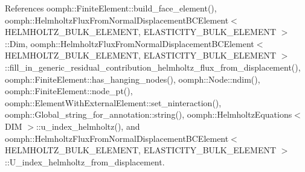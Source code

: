 References oomph\+::\+Finite\+Element\+::build\+\_\+face\+\_\+element(), oomph\+::\+Helmholtz\+Flux\+From\+Normal\+Displacement\+B\+C\+Element$<$ H\+E\+L\+M\+H\+O\+L\+T\+Z\+\_\+\+B\+U\+L\+K\+\_\+\+E\+L\+E\+M\+E\+N\+T, E\+L\+A\+S\+T\+I\+C\+I\+T\+Y\+\_\+\+B\+U\+L\+K\+\_\+\+E\+L\+E\+M\+E\+N\+T $>$\+::\+Dim, oomph\+::\+Helmholtz\+Flux\+From\+Normal\+Displacement\+B\+C\+Element$<$ H\+E\+L\+M\+H\+O\+L\+T\+Z\+\_\+\+B\+U\+L\+K\+\_\+\+E\+L\+E\+M\+E\+N\+T, E\+L\+A\+S\+T\+I\+C\+I\+T\+Y\+\_\+\+B\+U\+L\+K\+\_\+\+E\+L\+E\+M\+E\+N\+T $>$\+::fill\+\_\+in\+\_\+generic\+\_\+residual\+\_\+contribution\+\_\+helmholtz\+\_\+flux\+\_\+from\+\_\+displacement(), oomph\+::\+Finite\+Element\+::has\+\_\+hanging\+\_\+nodes(), oomph\+::\+Node\+::ndim(), oomph\+::\+Finite\+Element\+::node\+\_\+pt(), oomph\+::\+Element\+With\+External\+Element\+::set\+\_\+ninteraction(), oomph\+::\+Global\+\_\+string\+\_\+for\+\_\+annotation\+::string(), oomph\+::\+Helmholtz\+Equations$<$ D\+I\+M $>$\+::u\+\_\+index\+\_\+helmholtz(), and oomph\+::\+Helmholtz\+Flux\+From\+Normal\+Displacement\+B\+C\+Element$<$ H\+E\+L\+M\+H\+O\+L\+T\+Z\+\_\+\+B\+U\+L\+K\+\_\+\+E\+L\+E\+M\+E\+N\+T, E\+L\+A\+S\+T\+I\+C\+I\+T\+Y\+\_\+\+B\+U\+L\+K\+\_\+\+E\+L\+E\+M\+E\+N\+T $>$\+::\+U\+\_\+index\+\_\+helmholtz\+\_\+from\+\_\+displacement.

\mbox{\label{classoomph_1_1HelmholtzFluxFromNormalDisplacementBCElement_a5c093c485f9df81a14729f2ef41eced1}} 
